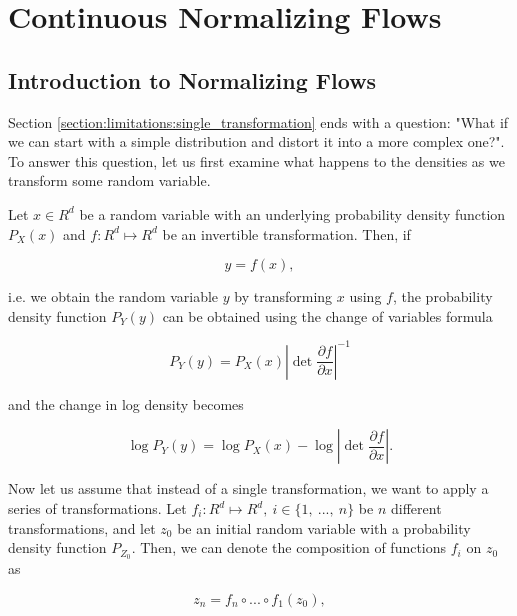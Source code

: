 \chapter{Continuous Normalizing Flows}
\label{chapter:cnf}

\section{Introduction to Normalizing Flows}
\label{section:cnf:normalizing_flows}

Section \ref{section:limitations:single_transformation} ends with a question: "What if we can start with a simple distribution and distort it into a more complex one?". To answer this question, let us first examine what happens to the densities as we transform some random variable.

Let $ x \in R^d $ be a random variable with an underlying probability density function $ P_X(x) $ and $ f: R^d \mapsto R^d $ be an invertible transformation. Then, if

\begin{displaymath}
    y = f(x),
\end{displaymath}

i.e. we obtain the random variable $ y $ by transforming $ x $ using $ f $, the probability density function $ P_Y(y) $ can be obtained using the change of variables formula

\begin{equation}
    \label{equation:cnf:nf:change_density}
    P_Y(y) = P_X(x) \left | \det \frac{\partial f}{\partial x} \right |^{-1}
\end{equation}

and the change in log density becomes

\begin{equation}
    \label{equation:cnf:nf:change_log_density}
    \log P_Y(y) = \log P_X(x) - \log \left | \det \frac{\partial f}{\partial x} \right |.
\end{equation}

Now let us assume that instead of a single transformation, we want to apply a series of transformations. Let $ f_i: R^d \mapsto R^d, \ i \in \{1, \ ..., \ n\} $ be $ n $ different transformations, and let $ z_0 $ be an initial random variable with a probability density function $ P_{Z_0} $. Then, we can denote the composition of functions $ f_i $ on $ z_0 $ as

\begin{displaymath}
    z_n = f_n \circ ... \circ f_1(z_0),
\end{displaymath}

